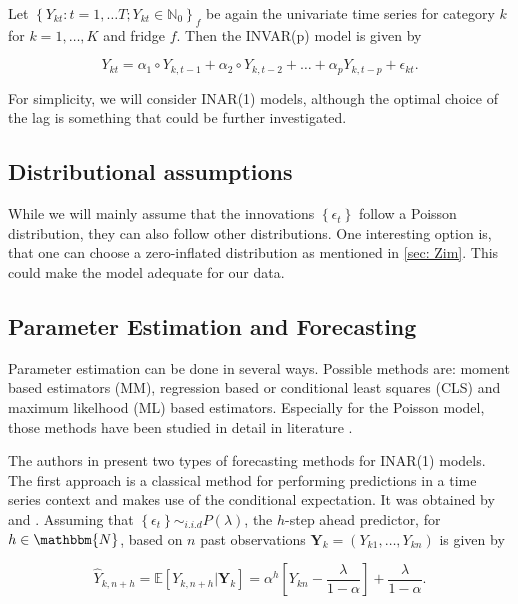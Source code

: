 Let $\left\{Y_{kt}:t=1,\ldots T; Y_{kt} \in \mathbb{N}_0\right\}_f$ be again the univariate time series for category $k$ for $k=1,\ldots,K$ and fridge $f$. Then the INVAR(p) model is given by

\begin{equation}
Y_{kt} = \alpha_1 \circ Y_{k,t-1} + \alpha_2 \circ Y_{k,t-2} + \ldots + \alpha_p Y_{k,t-p} +\epsilon_{kt}.
\label{eq:Inar(p) model ts}
\end{equation}

For simplicity, we will consider INAR(1) models, although the optimal choice of the lag is something that could be further investigated. 

\subsection{Distributional assumptions}
\label{sec: Inar Distributional assumptions}

While we will mainly assume that the innovations $\left\{\epsilon_t\right\}$ follow a Poisson distribution, they can also follow other distributions. One interesting option is, that one can choose a zero-inflated distribution as mentioned in \ref{sec: Zim}. This could make the model adequate for our data. 


\subsection{Parameter Estimation and Forecasting}
\label{sec: Inar Parameter Estimation and Forecasting}

Parameter estimation can be done in several ways. Possible methods are: moment based estimators (MM), regression based or conditional least squares (CLS) and maximum likelhood (ML) based estimators. Especially for the Poisson model, those methods have been studied in detail in literature \cite{Silva:2005}. 

The authors in \cite{Silva:2005} present two types of forecasting methods for INAR(1) models. The first approach is a classical method for performing predictions in a time series context and makes use of the conditional expectation. It was obtained by \cite{Bre:1993} and \cite{Freeland:2004}. Assuming that $\left\{\epsilon_t\right\} \sim_{i.i.d} P(\lambda)$, the $h$-step ahead predictor, for $h\in \mathbbm{N}$, based on $n$ past observations $\bm{Y}_k=(Y_{k1},\ldots,Y_{kn})$ is given by

\begin{equation}
\hat{Y}_{k,n+h} = \mathbb{E}[Y_{k,n+h} | \bm{Y}_k] = \alpha^h \left[Y_{kn}- \frac{\lambda}{1-\alpha} \right] + \frac{\lambda}{1-\alpha}.
\label{eq:Forecasting Classic}
\end{equation}


